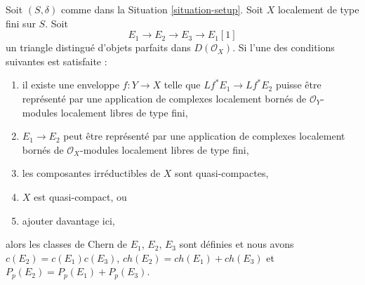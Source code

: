 \begin{lemma}
\label{lemma-additivity-on-perfect}
Soit $(S, \delta)$ comme dans la Situation \ref{situation-setup}.
Soit $X$ localement de type fini sur $S$. Soit
$$
E_1 \to E_2 \to E_3 \to E_1[1]
$$
un triangle distingué d'objets parfaits dans $D(\mathcal{O}_X)$.
Si l'une des conditions suivantes est satisfaite :
\begin{enumerate}
\item il existe une enveloppe $f : Y \to X$ telle que
$Lf^*E_1 \to Lf^*E_2$ puisse être représenté par une application de complexes
localement bornés de $\mathcal{O}_Y$-modules localement libres de type fini,
\item $E_1 \to E_2$ peut être représenté par une application de complexes localement bornés
de $\mathcal{O}_X$-modules localement libres de type fini,
\item les composantes irréductibles de $X$ sont quasi-compactes,
\item $X$ est quasi-compact, ou
\item ajouter davantage ici,
\end{enumerate}
alors les classes de Chern de $E_1$, $E_2$, $E_3$ sont définies et nous avons
$c(E_2) = c(E_1) c(E_3)$, $ch(E_2) = ch(E_1) + ch(E_3)$ et
$P_p(E_2) = P_p(E_1) + P_p(E_3)$.
\end{lemma}

